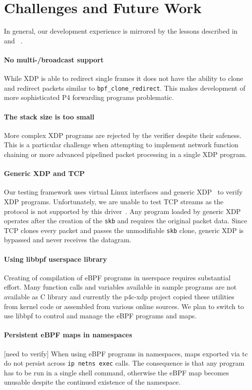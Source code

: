 \section{Challenges and Future Work}\label{sec:conclusions}
In general, our development experience is mirrored by the lessons described 
in~\cite{minao-hspr18} and ~\cite{bertin-netdev17}.

\paragraph{No multi-/broadcast support}
While XDP is able to redirect single frames it does not have the ability to 
clone and redirect packets similar to \texttt{bpf\_clone\_redirect}. This makes 
development of more sophisticated P4 forwarding programs problematic.

\paragraph{The stack size is too small}
More complex XDP programs are rejected by the verifier despite their safeness. 
This is a particular challenge when attempting to implement network function 
chaining or more advanced pipelined packet processing in a single XDP program.

\paragraph{Generic XDP and TCP}
Our testing framework uses virtual Linux interfaces and generic XDP~\cite{genericxdp}
to verify XDP programs. 
Unfortunately, we are unable to test TCP streams as the protocol is not 
supported by this driver~\cite{xdptcp}.
Any program loaded by generic XDP operates after the creation of
the \texttt{skb} and requires the original packet data. Since TCP clones every 
packet and passes the unmodifiable \texttt{skb} clone,  generic XDP is
bypassed and never receives the datagram.

\paragraph{Using libbpf userspace library}
Creating of compilation of eBPF programs in userspace requires substantial 
effort. Many function calls and variables available in sample programs are not 
available as C library and currently the p4c-xdp project copied these utilities
from kernel code or assembled from various online sources. We plan to switch to
use libbpf to control and manage the eBPF programs and maps.

\paragraph{Persistent eBPF maps in namespaces}
[need to verify] When using eBPF programs in namespaces, maps exported via tc 
do not persist across \texttt{ip netns exec} calls. The consequence is that any 
program has to be run in a single shell command, otherwise the eBPF map becomes 
unusable despite the continued existence of the namespace.
